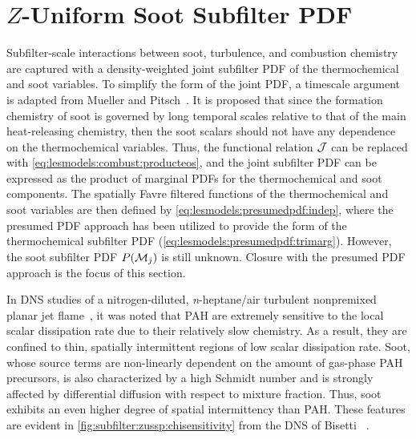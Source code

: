 \section{\texorpdfstring{$Z$}{Z}-Uniform Soot Subfilter PDF}
\label{sec:subfilter:zussp}

Subfilter-scale interactions between soot, turbulence, and combustion chemistry are captured with a density-weighted joint subfilter PDF of the thermochemical and soot variables. To simplify the form of the joint PDF, a timescale argument is adapted from Mueller and Pitsch~\cite{subfilterpdf2011}. It is proposed that since the formation chemistry of soot is governed by long temporal scales relative to that of the main heat-releasing chemistry, then the soot scalars should not have any dependence on the thermochemical variables. Thus, the functional relation $\mathcal{J}$ can be replaced with \cref{eq:lesmodels:combust:producteos}, and the joint subfilter PDF can be expressed as the product of marginal PDFs for the thermochemical and soot components. The spatially Favre filtered functions of the thermochemical and soot variables are then defined by \cref{eq:lesmodels:presumedpdf:indep}, where the presumed PDF approach has been utilized to provide the form of the thermochemical subfilter PDF (\cref{eq:lesmodels:presumedpdf:trimarg}). However, the soot subfilter PDF $P(\mathcal{M}_j)$ is still unknown. Closure with the presumed PDF approach is the focus of this section.

In DNS studies of a nitrogen-diluted, \textit{n}-heptane/air turbulent nonpremixed planar jet flame~\cite{bisetti2012,attili2014,attili2015}, it was noted that PAH are extremely sensitive to the local scalar dissipation rate due to their relatively slow chemistry. As a result, they are confined to thin, spatially intermittent regions of low scalar dissipation rate. Soot, whose source terms are non-linearly dependent on the amount of gas-phase PAH precursors, is also characterized by a high Schmidt number and is strongly affected by differential diffusion with respect to mixture fraction. Thus, soot exhibits an even higher degree of spatial intermittency than PAH. These features are evident in \cref{fig:subfilter:zussp:chisensitivity} from the DNS of Bisetti \etal~\cite{bisetti2012}.

